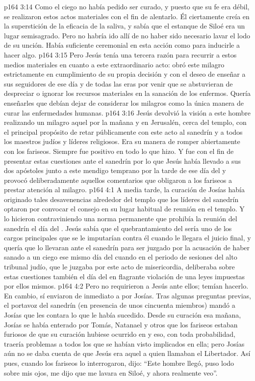 \vs p164 3:14 Como el ciego no había pedido ser curado, y puesto que su fe era débil, se realizaron estos actos materiales con el fin de alentarlo. Él ciertamente creía en la superstición de la eficacia de la saliva, y sabía que el estanque de Siloé era un lugar semisagrado. Pero no habría ido allí de no haber sido necesario lavar el lodo de su unción. Había suficiente ceremonial en esta acción como para inducirle a hacer algo.
\vs p164 3:15 Pero Jesús tenía una tercera razón para recurrir a estos medios materiales en cuanto a este extraordinario acto: obró este milagro estrictamente en cumplimiento de su propia decisión y con el deseo de enseñar a sus seguidores de ese día y de todas las eras por venir que se abstuvieran de despreciar o ignorar los recursos materiales en la sanación de los enfermos. Quería enseñarles que debían dejar de considerar los milagros como la única manera de curar las enfermedades humanas.
\vs p164 3:16 \pc Jesús devolvió la visión a este hombre realizando un milagro aquel  por la mañana y en Jerusalén, cerca del templo, con el principal propósito de retar públicamente con este acto al sanedrín y a todos los maestros judíos y líderes religiosos. Era su manera de romper abiertamente con los fariseos. Siempre fue positivo en todo lo que hizo. Y fue con el fin de presentar estas cuestiones ante el sanedrín por lo que Jesús había llevado a sus dos apóstoles junto a este mendigo temprano por la tarde de ese día del  y provocó deliberadamente aquellos comentarios que obligaron a los fariseos a prestar atención al milagro.
\vs p164 4:1 A media tarde, la curación de Josías había originado tales desavenencias alrededor del templo que los líderes del sanedrín optaron por convocar el consejo en su lugar habitual de reunión en el templo. Y lo hicieron contraviniendo una norma permanente que prohibía la reunión del sanedrín el día del . Jesús sabía que el quebrantamiento del  sería uno de los cargos principales que se le imputarían contra él cuando le llegara el juicio final, y quería que lo llevaran ante el sanedrín para ser juzgado por la acusación de haber sanado a un ciego ese mismo día del  cuando en el periodo de sesiones del alto tribunal judío, que le juzgaba por este acto de misericordia, deliberaba sobre estas cuestiones también el día del  en flagrante violación de una leyes impuestas por ellos mismos.
\vs p164 4:2 Pero no requirieron a Jesús ante ellos; temían hacerlo. En cambio, sí enviaron de inmediato a por Josías. Tras algunas preguntas previas, el portavoz del sanedrín (en presencia de unos cincuenta miembros) mandó a Josías que les contara lo que le había sucedido. Desde su curación esa mañana, Josías se había enterado por Tomás, Natanael y otros que los fariseos estaban furiosos de que su curación hubiese ocurrido en  y eso, con toda probabilidad, traería problemas a todos los que se habían visto implicados en ella; pero Josías aún no se daba cuenta de que Jesús era aquel a quien llamaban el Libertador. Así pues, cuando los fariseos lo interrogaron, dijo: “Este hombre llegó, puso lodo sobre mis ojos, me dijo que me lavara en Siloé, y ahora realmente veo”.
